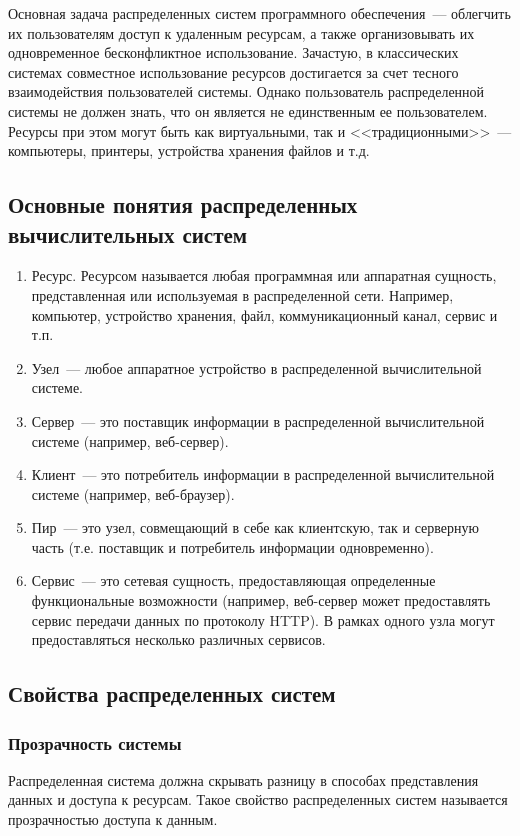 Основная задача распределенных систем программного обеспечения~--- облегчить их пользователям доступ к удаленным ресурсам, а также организовывать их одновременное бесконфликтное использование. Зачастую, в классических системах совместное использование ресурсов достигается за счет тесного взаимодействия пользователей системы. Однако пользователь распределенной системы не должен знать, что он является не единственным ее пользователем. Ресурсы при этом могут быть как виртуальными, так и <<традиционными>>~--- компьютеры, принтеры, устройства хранения файлов и т.д.

\subsection{Основные понятия распределенных вычислительных систем}
\begin{enumerate}
\item Ресурс. Ресурсом называется любая программная или аппаратная сущность, представленная или используемая в распределенной сети. Например, компьютер, устройство хранения, файл, коммуникационный канал, сервис и т.п.
\item Узел~--- любое аппаратное устройство в распределенной вычислительной системе.
\item Сервер~--- это поставщик информации в распределенной вычислительной системе (например, веб-сервер).
\item Клиент~--- это потребитель информации в распределенной вычислительной системе (например, веб-браузер).
\item Пир~--- это узел, совмещающий в себе как клиентскую, так и серверную часть (т.е. поставщик и потребитель информации одновременно).
\item Сервис~--- это сетевая сущность, предоставляющая определенные функциональные возможности (например, веб-сервер может предоставлять сервис передачи данных по протоколу HTTP). В рамках одного узла могут предоставляться несколько различных сервисов.
\end{enumerate}

\subsection{Свойства распределенных систем}
\subsubsection{Прозрачность системы}
Распределенная система должна скрывать разницу в способах представления данных и доступа к ресурсам. Такое свойство распределенных систем называется прозрачностью доступа к данным.

